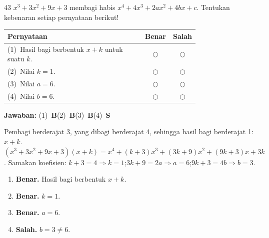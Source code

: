 \documentclass[11pt]{article}
\newcommand{\jawaban}[1]{%
  \noindent\colorbox{gold!30}{\parbox{\dimexpr\linewidth-2\fboxsep\relax}{%
    \textbf{Jawaban:} #1}}\par\smallskip}
\begin{document}
\begin{soal}{43}
$x^3+3x^2+9x+3$ membagi habis $x^4+4x^3+2ax^2+4bx+c$.
Tentukan kebenaran setiap pernyataan berikut!

\par\smallskip
{\renewcommand{\arraystretch}{1.4}%
\begin{tabular}{@{}p{0.76\linewidth}cc@{}}
\hline\textbf{Pernyataan}&\textbf{Benar}&\textbf{Salah}\\\hline
(1)~Hasil bagi berbentuk $x+k$ untuk suatu $k$.&$\bigcirc$&$\bigcirc$\\
(2)~Nilai $k=1$.&$\bigcirc$&$\bigcirc$\\
(3)~Nilai $a=6$.&$\bigcirc$&$\bigcirc$\\
(4)~Nilai $b=6$.&$\bigcirc$&$\bigcirc$\\\hline
\end{tabular}}
\end{soal}
\begin{pembox}
\jawaban{(1)~\textbf{B}\quad(2)~\textbf{B}\quad(3)~\textbf{B}\quad(4)~\textbf{S}}
Pembagi berderajat 3, yang dibagi berderajat 4, sehingga hasil bagi berderajat 1: $x+k$.
$(x^3+3x^2+9x+3)(x+k)=x^4+(k+3)x^3+(3k+9)x^2+(9k+3)x+3k$.
Samakan koefisien:
$k+3=4\Rightarrow k=1$;\quad$3k+9=2a\Rightarrow a=6$;\quad$9k+3=4b\Rightarrow b=3$.
\begin{enumerate}[leftmargin=*,topsep=2pt,itemsep=2pt]
\item \textbf{Benar.} Hasil bagi berbentuk $x+k$.
\item \textbf{Benar.} $k=1$.
\item \textbf{Benar.} $a=6$.
\item \textbf{Salah.} $b=3\neq6$.
\end{enumerate}
\end{pembox}
\end{document}
